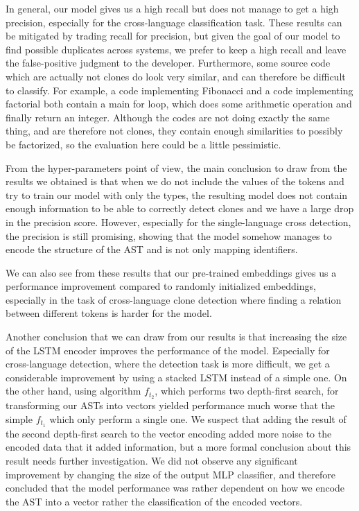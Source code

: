 In general, our model gives us a high recall but does not manage to get a high
precision, especially for the cross-language classification task. These results
can be mitigated by trading recall for precision, but given the goal of our
model to find possible duplicates across systems, we prefer to keep a high
recall and leave the false-positive judgment to the developer. Furthermore, some
source code which are actually not clones do look very similar, and can
therefore be difficult to classify. For example, a code implementing Fibonacci
and a code implementing factorial both contain a main for loop, which does some
arithmetic operation and finally return an integer. Although the codes are not
doing exactly the same thing, and are therefore not clones, they contain enough
similarities to possibly be factorized, so the evaluation here could be a little
pessimistic.

From the hyper-parameters point of view, the main conclusion to draw from the
results we obtained is that when we do not include the values of the tokens and
try to train our model with only the types, the resulting model does not contain
enough information to be able to correctly detect clones and we have a large
drop in the precision score. However, especially for the single-language cross
detection, the precision is still promising, showing that the model somehow
manages to encode the structure of the AST and is not only mapping identifiers.

We can also see from these results that our pre-trained embeddings gives us a
performance improvement compared to randomly initialized embeddings, especially
in the task of cross-language clone detection where finding a relation between
different tokens is harder for the model.

Another conclusion that we can draw from our results is that increasing the size
of the LSTM encoder improves the performance of the model. Especially for
cross-language detection, where the detection task is more difficult, we get a
considerable improvement by using a stacked LSTM instead of a simple one.
On the other hand, using algorithm $f_{t_2}$, which performs two depth-first
search, for transforming our ASTs into vectors yielded performance much worse
that the simple $f_{t_1}$ which only perform a single one. We suspect that
adding the result of the second depth-first search to the vector encoding added
more noise to the encoded data that it added information, but a more formal
conclusion about this result needs further investigation. We did not observe any
significant improvement by changing the size of the output MLP classifier, and
therefore concluded that the model performance was rather dependent on how we
encode the AST into a vector rather the classification of the encoded vectors. 
